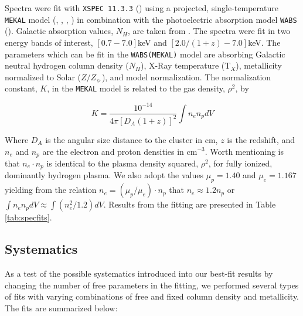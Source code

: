 \documentclass[12pt, preprint]{aastex}
\begin{document}
Spectra were fit with {\tt XSPEC 11.3.3}
(\cite{1996ASPC..101...17A}) using a projected, single-temperature {\tt MEKAL} model
(\cite{1985A&AS...62..197M}, \cite{1986A&AS...65..511M},
\cite{1992SRON}, \cite{1995ApJ...438L.115L})
in combination with the photoelectric
absorption model {\tt WABS} (\cite{1983ApJ...270..119M}). Galactic
absorption values, $N_{H}$, are taken from
\cite{1990ARA&A..28..215D}. The spectra were fit in two energy bands of
interest, $[0.7-7.0]$keV and $[2.0/(1+z)-7.0]$keV. The
parameters which can be fit in the {\tt WABS(MEKAL)} model are
absorbing Galactic neutral hydrogen column density ($N_{H}$), X-Ray temperature (T$_{X}$),
metallicity normalized to Solar ($Z/Z_{\sun}$), and model
normalization. The normalization constant, $K$, in the {\tt MEKAL} model is
related to the gas density, $\rho^2$, by

\begin{equation}
K = \frac{10^{-14}}{4\pi[D_A (1+z)]^2} \int n_e n_p dV
\end{equation}

Where $D_A$ is the angular size distance to the cluster in cm, $z$ is
the redshift, and $n_e$ and $n_p$ are the electron and proton
densities in cm$^{-3}$. Worth mentioning is that $n_e \cdot n_p$
is identical to the plasma density squared, $\rho^2$, for fully
ionized, dominantly hydrogen plasma. We also adopt the values
$\mu_p=1.40$ and $\mu_e=1.167$ yielding from the relation $n_e =
(\mu_p/\mu_e) \cdot n_p$ that $n_e \approx 1.2 n_p$ or $\int n_e n_p dV
\approx \int (n_e^2/1.2) dV$. Results from the
fitting are presented in Table \ref{tab:specfits}.


\subsection{Systematics} \label{sec:systematics}

As a test of the possible systematics introduced into our best-fit
results by changing the number of free parameters in the fitting, we
performed several types of fits with varying combinations of free and
fixed column density and metallicity. The fits are summarized below:
\end{document}
